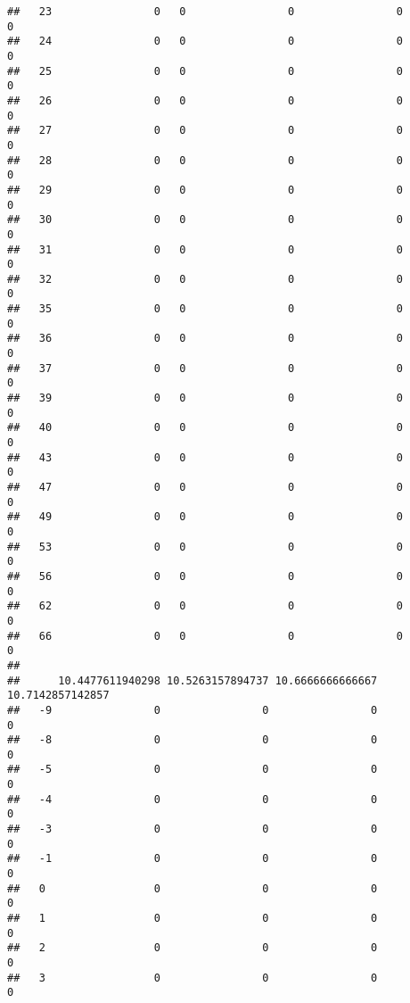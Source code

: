 \documentclass[]{article}
\begin{document}
\begin{verbatim}
##   23                0   0                0                0                0
##   24                0   0                0                0                0
##   25                0   0                0                0                0
##   26                0   0                0                0                0
##   27                0   0                0                0                0
##   28                0   0                0                0                0
##   29                0   0                0                0                0
##   30                0   0                0                0                0
##   31                0   0                0                0                0
##   32                0   0                0                0                0
##   35                0   0                0                0                0
##   36                0   0                0                0                0
##   37                0   0                0                0                0
##   39                0   0                0                0                0
##   40                0   0                0                0                0
##   43                0   0                0                0                0
##   47                0   0                0                0                0
##   49                0   0                0                0                0
##   53                0   0                0                0                0
##   56                0   0                0                0                0
##   62                0   0                0                0                0
##   66                0   0                0                0                0
##     
##      10.4477611940298 10.5263157894737 10.6666666666667 10.7142857142857
##   -9                0                0                0                0
##   -8                0                0                0                0
##   -5                0                0                0                0
##   -4                0                0                0                0
##   -3                0                0                0                0
##   -1                0                0                0                0
##   0                 0                0                0                0
##   1                 0                0                0                0
##   2                 0                0                0                0
##   3                 0                0                0                0

\end{verbatim}
\end{document}
